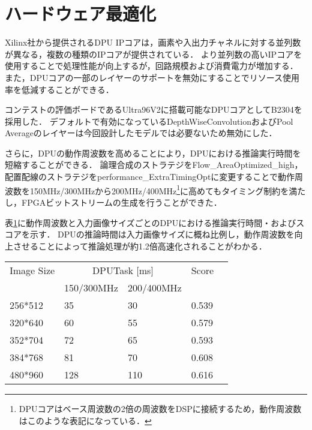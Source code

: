\section{ハードウェア最適化}
Xilinx社から提供されるDPU IPコアは，画素や入出力チャネルに対する並列数が異なる，複数の種類のIPコアが提供されている．
より並列数の高いIPコアを使用することで処理性能が向上するが，回路規模および消費電力が増加する．
また，DPUコアの一部のレイヤーのサポートを無効にすることでリソース使用率を低減することができる．

コンテストの評価ボードであるUltra96V2に搭載可能なDPUコアとしてB2304を採用した．
デフォルトで有効になっているDepthWiseConvolutionおよびPool Averageのレイヤーは今回設計したモデルでは必要ないため無効にした．

さらに，DPUの動作周波数を高めることにより，DPUにおける推論実行時間を短縮することができる．
論理合成のストラテジをFlow\_AreaOptimized\_high，配置配線のストラテジをperformance\_ExtraTimingOptに変更することで動作周波数を150MHz/300MHzから200MHz/400MHz\footnote{DPUコアはベース周波数の2倍の周波数をDSPに接続するため，動作周波数はこのような表記になっている．}に高めてもタイミング制約を満たし，FPGAビットストリームの生成を行うことができた．

表\ref{runtimetable}に動作周波数と入力画像サイズごとのDPUにおける推論実行時間・およびスコアを示す．
DPUの推論時間は入力画像サイズに概ね比例し，動作周波数を向上させることによって推論処理が約1.2倍高速化されることがわかる．
\begin{table}[]
    \label{runtimetable}
    \begin{center}
        \begin{tabular}{lllll}
            Image Size & \multicolumn{2}{c}{DPUTask {[}ms{]}}                            & \multicolumn{1}{c}{Score} &  \\
                & \multicolumn{1}{r}{150/300MHz} & \multicolumn{1}{r}{200/400MHz} &                           &  \\ \hline
        256*512 & 35                             & 30                             & 0.539                     &  \\ \hline
        320*640 & 60                             & 55                             & 0.579                     &  \\ \hline
        352*704 & 72                             & 65                             & 0.593                     &  \\ \hline
        384*768 & 81                             & 70                             & 0.608                     &  \\ \hline
        480*960 & 128                            & 110                            & 0.616                     & 
        \end{tabular}
    \end{center}
\end{table}
